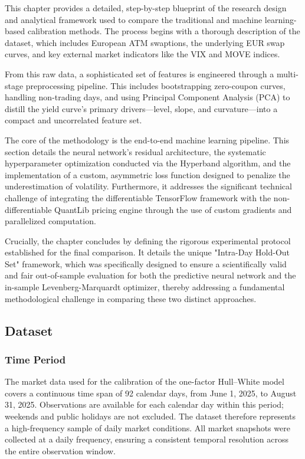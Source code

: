 This chapter provides a detailed, step-by-step blueprint of the research design and analytical framework used to compare the traditional and machine learning-based calibration methods. The process begins with a thorough description of the dataset, which includes European ATM swaptions, the underlying EUR swap curves, and key external market indicators like the VIX and MOVE indices.

From this raw data, a sophisticated set of features is engineered through a multi-stage preprocessing pipeline. This includes bootstrapping zero-coupon curves, handling non-trading days, and using Principal Component Analysis (PCA) to distill the yield curve's primary drivers—level, slope, and curvature—into a compact and uncorrelated feature set.

The core of the methodology is the end-to-end machine learning pipeline. This section details the neural network's residual architecture, the systematic hyperparameter optimization conducted via the Hyperband algorithm, and the implementation of a custom, asymmetric loss function designed to penalize the underestimation of volatility. Furthermore, it addresses the significant technical challenge of integrating the differentiable TensorFlow framework with the non-differentiable QuantLib pricing engine through the use of custom gradients and parallelized computation.

Crucially, the chapter concludes by defining the rigorous experimental protocol established for the final comparison. It details the unique "Intra-Day Hold-Out Set" framework, which was specifically designed to ensure a scientifically valid and fair out-of-sample evaluation for both the predictive neural network and the in-sample Levenberg-Marquardt optimizer, thereby addressing a fundamental methodological challenge in comparing these two distinct approaches.

\subsection{Dataset}
\subsubsection{Time Period}
The market data used for the calibration of the one-factor Hull–White model covers a continuous time span of 92 calendar days, from June 1, 2025, to August 31, 2025. Observations are available for each calendar day within this period; weekends and public holidays are not excluded. The dataset therefore represents a high-frequency sample of daily market conditions. All market snapshots were collected at a daily frequency, ensuring a consistent temporal resolution across the entire observation window.

